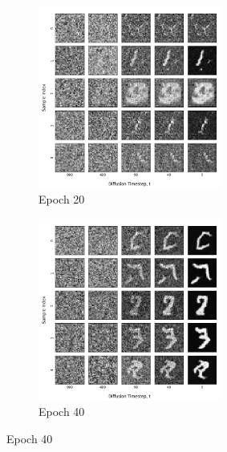 \documentclass[12pt]{article}
\begin{document}
\begin{figure}[hp]
    \begin{subfigure}{0.49\textwidth}
    \includegraphics[width=0.9\linewidth, height=6cm, center]{figures/diffusion_plot_2_0020.png}
    \caption{Epoch 20}
    \label{fig:2_20}
    \end{subfigure}
    \begin{subfigure}{0.49\textwidth}
    \includegraphics[width=0.9\linewidth, height=6cm, center]{figures/diffusion_plot_2_0040.png}
    \caption{Epoch 40}
    \label{fig:2_40}
    \end{subfigure}


\end{figure}
\end{document}
